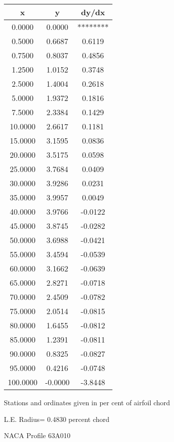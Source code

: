 \documentclass[11pt]{book}
\begin{document}
 \vspace{8mm}
 \begin{tabular}{|c|c|c|} \hline 
  x  &  y  &  dy/dx \\
 \hline
0.0000 & 0.0000 & ******** \\
0.5000 & 0.6687 & 0.6119 \\
0.7500 & 0.8037 & 0.4856 \\
1.2500 & 1.0152 & 0.3748 \\
2.5000 & 1.4004 & 0.2618 \\
5.0000 & 1.9372 & 0.1816 \\
7.5000 & 2.3384 & 0.1429 \\
10.0000 & 2.6617 & 0.1181 \\
15.0000 & 3.1595 & 0.0836 \\
20.0000 & 3.5175 & 0.0598 \\
25.0000 & 3.7684 & 0.0409 \\
30.0000 & 3.9286 & 0.0231 \\
35.0000 & 3.9957 & 0.0049 \\
40.0000 & 3.9766 & -0.0122 \\
45.0000 & 3.8745 & -0.0282 \\
50.0000 & 3.6988 & -0.0421 \\
55.0000 & 3.4594 & -0.0539 \\
60.0000 & 3.1662 & -0.0639 \\
65.0000 & 2.8271 & -0.0718 \\
70.0000 & 2.4509 & -0.0782 \\
75.0000 & 2.0514 & -0.0815 \\
80.0000 & 1.6455 & -0.0812 \\
85.0000 & 1.2391 & -0.0811 \\
90.0000 & 0.8325 & -0.0827 \\
95.0000 & 0.4216 & -0.0748 \\
100.0000 & -0.0000 & -3.8448 \\
 \hline
 \end{tabular}
 \vspace{8mm}


Stations and ordinates given in per cent of airfoil chord 


L.E. Radius=  0.4830 percent chord
 \newpage
  \label{p63A010}
 \begin{Large}
 NACA Profile 63A010
 \end{Large}
  
\end{document}
